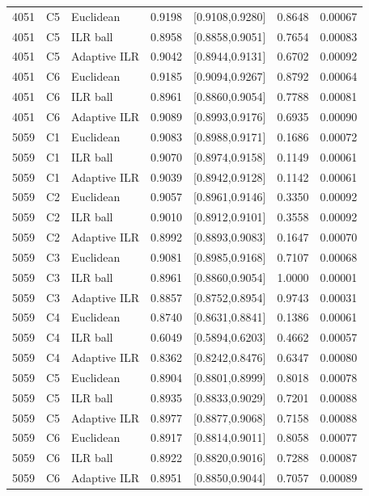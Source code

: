 \begin{longtable}{rrlrrrr}
4051 & C5 & Euclidean & 0.9198 & [0.9108,0.9280] & 0.8648 & 0.00067 \\
4051 & C5 & ILR ball & 0.8958 & [0.8858,0.9051] & 0.7654 & 0.00083 \\
4051 & C5 & Adaptive ILR & 0.9042 & [0.8944,0.9131] & 0.6702 & 0.00092 \\
4051 & C6 & Euclidean & 0.9185 & [0.9094,0.9267] & 0.8792 & 0.00064 \\
4051 & C6 & ILR ball & 0.8961 & [0.8860,0.9054] & 0.7788 & 0.00081 \\
4051 & C6 & Adaptive ILR & 0.9089 & [0.8993,0.9176] & 0.6935 & 0.00090 \\
5059 & C1 & Euclidean & 0.9083 & [0.8988,0.9171] & 0.1686 & 0.00072 \\
5059 & C1 & ILR ball & 0.9070 & [0.8974,0.9158] & 0.1149 & 0.00061 \\
5059 & C1 & Adaptive ILR & 0.9039 & [0.8942,0.9128] & 0.1142 & 0.00061 \\
5059 & C2 & Euclidean & 0.9057 & [0.8961,0.9146] & 0.3350 & 0.00092 \\
5059 & C2 & ILR ball & 0.9010 & [0.8912,0.9101] & 0.3558 & 0.00092 \\
5059 & C2 & Adaptive ILR & 0.8992 & [0.8893,0.9083] & 0.1647 & 0.00070 \\
5059 & C3 & Euclidean & 0.9081 & [0.8985,0.9168] & 0.7107 & 0.00068 \\
5059 & C3 & ILR ball & 0.8961 & [0.8860,0.9054] & 1.0000 & 0.00001 \\
5059 & C3 & Adaptive ILR & 0.8857 & [0.8752,0.8954] & 0.9743 & 0.00031 \\
5059 & C4 & Euclidean & 0.8740 & [0.8631,0.8841] & 0.1386 & 0.00061 \\
5059 & C4 & ILR ball & 0.6049 & [0.5894,0.6203] & 0.4662 & 0.00057 \\
5059 & C4 & Adaptive ILR & 0.8362 & [0.8242,0.8476] & 0.6347 & 0.00080 \\
5059 & C5 & Euclidean & 0.8904 & [0.8801,0.8999] & 0.8018 & 0.00078 \\
5059 & C5 & ILR ball & 0.8935 & [0.8833,0.9029] & 0.7201 & 0.00088 \\
5059 & C5 & Adaptive ILR & 0.8977 & [0.8877,0.9068] & 0.7158 & 0.00088 \\
5059 & C6 & Euclidean & 0.8917 & [0.8814,0.9011] & 0.8058 & 0.00077 \\
5059 & C6 & ILR ball & 0.8922 & [0.8820,0.9016] & 0.7288 & 0.00087 \\
5059 & C6 & Adaptive ILR & 0.8951 & [0.8850,0.9044] & 0.7057 & 0.00089 \\
\bottomrule
\end{longtable}
